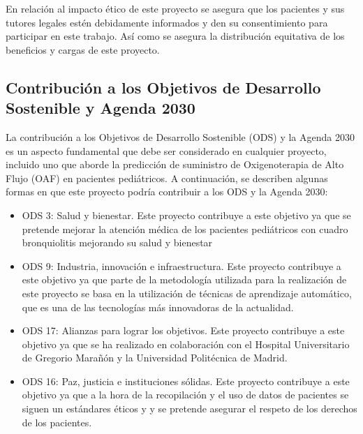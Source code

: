 En relación al impacto ético de este proyecto se asegura que los pacientes y sus tutores legales estén debidamente informados y den su consentimiento para participar en este trabajo. Así como se asegura la distribución equitativa de los beneficios y cargas de este proyecto.
\newpage

\subsection{Contribución a los Objetivos de Desarrollo Sostenible y Agenda 2030}

La contribución a los Objetivos de Desarrollo Sostenible (ODS) y la Agenda 2030 es un aspecto fundamental que debe ser considerado en cualquier proyecto, incluido uno que aborde la predicción de suministro de Oxigenoterapia de Alto Flujo (OAF) en pacientes pediátricos. A continuación, se describen algunas formas en que este proyecto podría contribuir a los ODS y la Agenda 2030:

\begin{itemize}
    \item \textsc{ODS 3:} Salud y bienestar. Este proyecto contribuye a este objetivo ya que se pretende mejorar la atención médica de los pacientes pediátricos con cuadro bronquiolitis mejorando su salud y bienestar
    \item \textsc{ODS 9:} Industria, innovación e infraestructura. Este proyecto contribuye a este objetivo ya que parte de la metodología utilizada para la realización de este proyecto se basa en la utilización de técnicas de aprendizaje automático, que es una de las tecnologías más innovadoras de la actualidad.
    \item \textsc{ODS 17:} Alianzas para lograr los objetivos. Este proyecto contribuye a este objetivo ya que se ha realizado en colaboración con el Hospital Universitario de Gregorio Marañón y la Universidad Politécnica de Madrid.
    \item \textsc{ODS 16:} Paz, justicia e instituciones sólidas. Este proyecto contribuye a este objetivo ya que a la hora de la recopilación y el uso de datos de pacientes se siguen un estándares éticos y y se pretende asegurar el respeto de los derechos de los pacientes.
\end{itemize}

